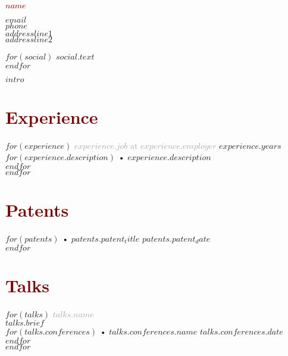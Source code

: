 \documentclass[$fontsize$, a4paper]{article}
\begin{document}
\textcolor{Maroon}{\LARGE \textbf{$name$}}\\[.2cm]

\begin{multicols}{2}

\textcolor{darkgray}{} \href{mailto:$email$}{$email$}\\
\textcolor{darkgray}{} $phone$\\
\textcolor{darkgray}{} $addressline1$\\
\textcolor{white}{} $addressline2$\\

\columnbreak

$for(social)$
  \textcolor{darkgray}{} \href{$social.url$}{$social.text$}\\
$endfor$
\end{multicols}

$intro$

\section*{\textcolor{Maroon}{Experience}}
$for(experience)$
  \textcolor{darkgray}{\textbf{$experience.job$} at \textbf{$experience.employer$}} \hfill $experience.years$\\
  $for(experience.description)$
    • {$experience.description$}\\
  $endfor$
  \\[.05cm]
$endfor$

\section*{\textcolor{Maroon}{Patents}}
$for(patents)$
  • \href{$patents.patent_url$}{$patents.patent_title$} \hfill $patents.patent_date$\\
$endfor$

\section*{\textcolor{Maroon}{Talks}}
$for(talks)$
  \textcolor{darkgray}{\textbf{$talks.name$}}\\
  {$talks.brief$}\\
  $for(talks.conferences)$
    • \href{$talks.conferences.url$}{$talks.conferences.name$} \hfill $talks.conferences.date$\\
  $endfor$
  \\[.05cm]
$endfor$
\end{document}
